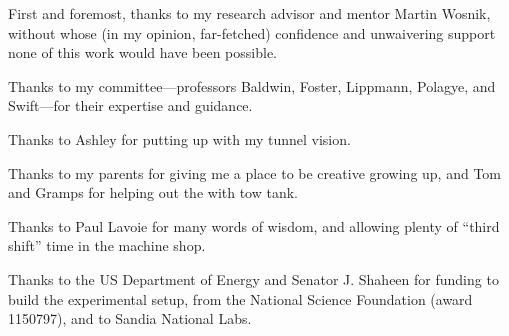 



\begin{Acknowledgments}
\setlength{\baselineskip}{1.5\baselineskip} 
{ 
    
    First and foremost, thanks to my research advisor and mentor Martin Wosnik,
    without whose (in my opinion, far-fetched) confidence and unwaivering
    support none of this work would have been possible.
    
    Thanks to my committee---professors Baldwin, Foster, Lippmann, Polagye, and
    Swift---for their expertise and guidance.
    
    Thanks to Ashley for putting up with my tunnel vision.
    
    Thanks to my parents for giving me a place to be creative growing up, and
    Tom and Gramps for helping out the with tow tank.
    
    Thanks to Paul Lavoie for many words of wisdom, and allowing plenty of
    ``third shift'' time in the machine shop.
    
    Thanks to the US Department of Energy and Senator J. Shaheen for funding to
    build the experimental setup, from the National Science Foundation (award
    1150797), and to Sandia National Labs.
    

}
\end{Acknowledgments}
